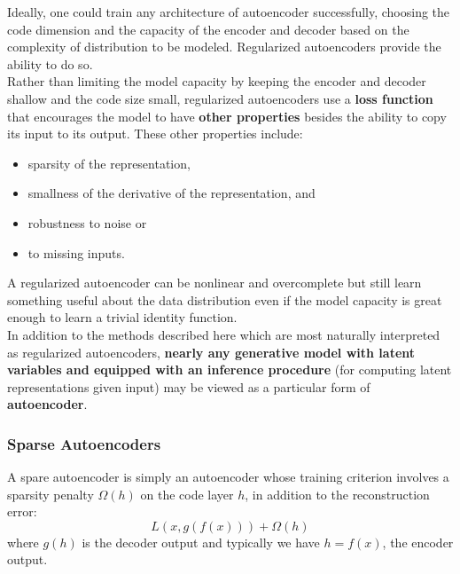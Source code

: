 \documentclass[11pt]{article}
\begin{document}
Ideally, one could train any architecture of autoencoder successfully, choosing the code dimension and the capacity of the encoder and decoder based on the complexity of distribution to be modeled. Regularized autoencoders provide the ability to do so.\\


Rather than limiting the model capacity by keeping the encoder and decoder shallow and the code size small, regularized autoencoders use a \textbf{loss function} that encourages the model to have \textbf{other properties} besides the ability to copy its input to its output. These other properties include:\\
\begin{itemize}
\item sparsity of the representation,\\
\item smallness of the derivative of the representation, and\\
\item robustness to noise or\\
\item to missing inputs.\\
\end{itemize}
A regularized autoencoder can be nonlinear and overcomplete but still learn something useful about the data distribution even if the model capacity is great enough to learn a trivial identity function.\\

In addition to the methods described here which are most naturally interpreted as regularized autoencoders, \textbf{nearly any generative model with latent variables and equipped with an inference procedure} (for computing latent representations given input) may be viewed as a particular form of \textbf{autoencoder}.\\


\subsubsection{Sparse Autoencoders}
\label{sec:org784f96f}
A spare autoencoder is simply an autoencoder whose training criterion involves a sparsity penalty \(\Omega(h)\) on the code layer \(h\), in addition to the reconstruction error:\\
\begin{equation}
L(x,g(f(x))) + \Omega(h)
\end{equation}
where \(g(h)\) is the decoder output and typically we have \(h=f(x)\), the encoder output.\\
\end{document}
